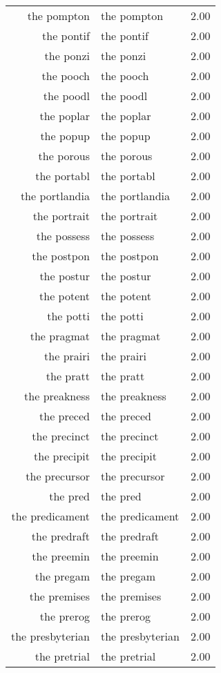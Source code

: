 \begin{table}[ht]
\begin{tabular}{rlr}
  the pompton & the pompton & 2.00 \\ 
  the pontif & the pontif & 2.00 \\ 
  the ponzi & the ponzi & 2.00 \\ 
  the pooch & the pooch & 2.00 \\ 
  the poodl & the poodl & 2.00 \\ 
  the poplar & the poplar & 2.00 \\ 
  the popup & the popup & 2.00 \\ 
  the porous & the porous & 2.00 \\ 
  the portabl & the portabl & 2.00 \\ 
  the portlandia & the portlandia & 2.00 \\ 
  the portrait & the portrait & 2.00 \\ 
  the possess & the possess & 2.00 \\ 
  the postpon & the postpon & 2.00 \\ 
  the postur & the postur & 2.00 \\ 
  the potent & the potent & 2.00 \\ 
  the potti & the potti & 2.00 \\ 
  the pragmat & the pragmat & 2.00 \\ 
  the prairi & the prairi & 2.00 \\ 
  the pratt & the pratt & 2.00 \\ 
  the preakness & the preakness & 2.00 \\ 
  the preced & the preced & 2.00 \\ 
  the precinct & the precinct & 2.00 \\ 
  the precipit & the precipit & 2.00 \\ 
  the precursor & the precursor & 2.00 \\ 
  the pred & the pred & 2.00 \\ 
  the predicament & the predicament & 2.00 \\ 
  the predraft & the predraft & 2.00 \\ 
  the preemin & the preemin & 2.00 \\ 
  the pregam & the pregam & 2.00 \\ 
  the premises & the premises & 2.00 \\ 
  the prerog & the prerog & 2.00 \\ 
  the presbyterian & the presbyterian & 2.00 \\ 
  the pretrial & the pretrial & 2.00 \\ 

\end{tabular}
\end{table}
